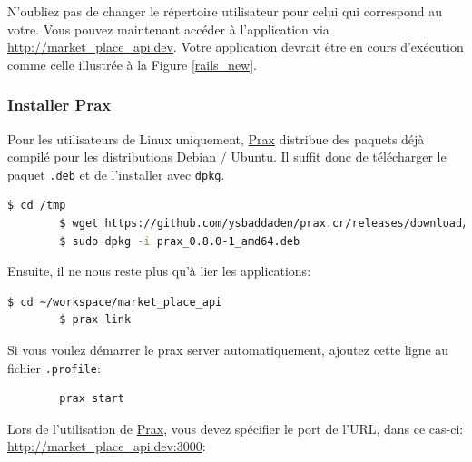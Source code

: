 \documentclass[]{report}
\begin{document}
        N'oubliez pas de changer le répertoire utilisateur pour celui qui correspond au votre. Vous pouvez maintenant accéder à l'application via \href{http://market_place_api.dev/}{http://market\_place\_api.dev}. Votre application devrait être en cours d'exécution comme celle illustrée à la Figure \ref{rails_new}.

      \subsubsection{Installer Prax}\label{subsubsect:prax}

        Pour les utilisateurs de Linux uniquement, \href{https://github.com/ysbaddaden/prax.cr}{Prax} distribue des paquets déjà compilé pour les distributions Debian / Ubuntu. Il suffit donc de télécharger le paquet \verb|.deb| et de l'installer avec \verb|dpkg|.

        \begin{scriptsize}
        \begin{lstlisting}[language=bash, breaklines]
        $ cd /tmp
        $ wget https://github.com/ysbaddaden/prax.cr/releases/download/v0.8.0/prax_0.8.0-1_amd64.deb
        $ sudo dpkg -i prax_0.8.0-1_amd64.deb
        \end{lstlisting}
        \end{scriptsize}

        Ensuite, il ne nous reste plus qu'à lier les applications:

        \begin{scriptsize}
        \begin{lstlisting}[language=bash]
        $ cd ~/workspace/market_place_api
        $ prax link
        \end{lstlisting}
        \end{scriptsize}

        Si vous voulez démarrer le prax server automatiquement, ajoutez cette ligne au fichier \verb|.profile|:

        \begin{scriptsize}
        \begin{lstlisting}
        prax start
        \end{lstlisting}
        \end{scriptsize}

        Lors de l'utilisation de \href{https://github.com/ysbaddaden/prax.cr}{Prax}, vous devez spécifier le port de l'URL, dans ce cas-ci: \href{http://market_place_api.dev:3000/}{http://market\_place\_api.dev:3000}:
\end{document}

